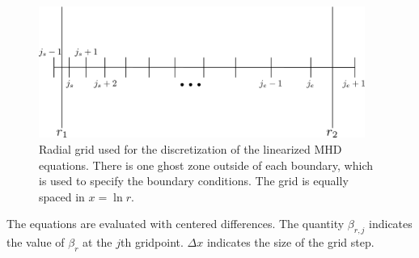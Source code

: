 \documentclass[letterpaper]{article}
\begin{document}
\begin{figure}
\centering
\includegraphics[width=0.95\textwidth]{globalcode_grid}
\caption[Radial grid used for discretizing linearized MHD
  equations]{Radial grid used for the discretization of the linearized
  MHD equations. There is one ghost zone outside of each boundary,
  which is used to specify the boundary conditions. The grid is
  equally spaced in $x=\ln{r}$.}
\label{fig:globalcode:globalcode_grid}
\end{figure}

The equations are evaluated with centered differences.  The quantity
$\beta_{r,j}$ indicates the value of $\beta_r$ at the $j$th
gridpoint. $\Delta x$ indicates the size of the grid step.
\end{document}
